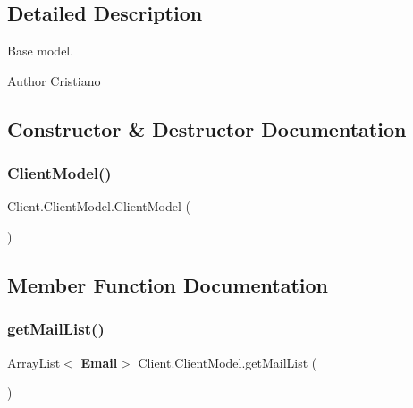 \subsection{Detailed Description}
Base model. 

\begin{DoxyAuthor}{Author}
Cristiano 
\end{DoxyAuthor}


\subsection{Constructor \& Destructor Documentation}
\mbox{\label{class_client_1_1_client_model_a0bf116e18c35797a65543e5c8341adfd}} 
\subsubsection{Client\+Model()}
{\footnotesize\ttfamily Client.\+Client\+Model.\+Client\+Model (\begin{DoxyParamCaption}{ }\end{DoxyParamCaption})}



\subsection{Member Function Documentation}
\mbox{\label{class_client_1_1_client_model_a65ca5e7cf07eb5d68b15d781a7e53f31}} 
\subsubsection{get\+Mail\+List()}
{\footnotesize\ttfamily Array\+List$<$\textbf{ Email}$>$ Client.\+Client\+Model.\+get\+Mail\+List (\begin{DoxyParamCaption}{ }\end{DoxyParamCaption})}

\mbox{\label{class_client_1_1_client_model_a5f91b8b7e6245106fcc70af2b32482dd}} 
